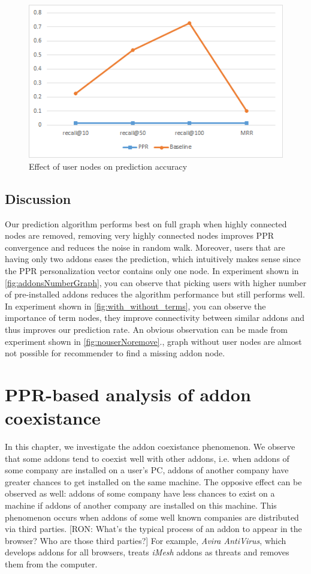 \documentclass[11pt,oneside]{book}
\let\Oldsection\section
\renewcommand{\section}{\FloatBarrier\Oldsection}
\begin{document}
\begin{figure}[h]
\centering
\includegraphics[scale=.8,angle=0]{figures/nouserNoremove.png}
\caption{Effect of user nodes on prediction accuracy}
\label{fig:nouserNoremove}
\end{figure}


\section{Discussion}
Our prediction algorithm performs best on full graph when highly connected nodes are removed, removing very highly connected nodes improves PPR convergence and reduces the noise in random walk.
Moreover, users that are having only two addons eases the prediction, which intuitively makes sense since the PPR personalization vector contains only one node. In experiment shown in \autoref{fig:addonsNumberGraph}, you can observe that picking users with higher number of pre-installed addons reduces the algorithm performance but still performs well. In experiment shown in \autoref{fig:with_without_terms}, you can observe the importance of term nodes, they improve connectivity between similar addons and thus improves our prediction rate. An obvious observation can be made from experiment shown in \autoref{fig:nouserNoremove}., graph without user nodes are almost not possible for recommender to find a missing addon node.




\chapter{PPR-based analysis of addon coexistance}
\label{chap:Symbiosis}

In this chapter, we investigate the addon coexistance phenomenon. We observe that some addons tend to coexist well with other addons, i.e. when addons of some company are installed on a user's PC, addons of another company have greater chances to get installed on the same machine. The opposive effect can be observed as well: addons of some company have less chances to exist on a machine if addons of another company are installed on this machine. This phenomenon occurs when addons of some well known companies are distributed via third parties. [RON: What's the typical process of an addon to appear in the browser? Who are those third parties?] For example, \emph{Avira AntiVirus}, which develops addons for all browsers, treats \emph{iMesh} addons as threats and removes them from the computer.
\end{document}
